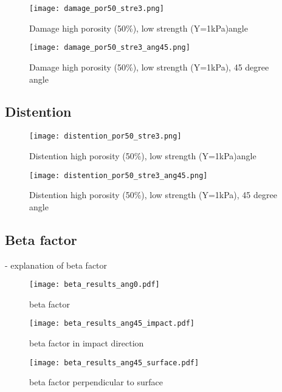 \begin{figure}[H]
   \centering
   \texttt{[image: damage\_por50\_stre3.png]}
   \caption{Damage high porosity (50\%), low strength (Y=1kPa)angle}
   \label{fig:crater6}
\end{figure}

\begin{figure}[H]
   \centering
   \texttt{[image: damage\_por50\_stre3\_ang45.png]}
   \caption{Damage high porosity (50\%), low strength (Y=1kPa), 45 degree angle}
   \label{fig:crater6}
\end{figure}

\subsection{Distention}

\begin{figure}[H]
   \centering
   \texttt{[image: distention\_por50\_stre3.png]}
   \caption{Distention high porosity (50\%), low strength (Y=1kPa)angle}
   \label{fig:crater6}
\end{figure}

\begin{figure}[H]
   \centering
   \texttt{[image: distention\_por50\_stre3\_ang45.png]}
   \caption{Distention high porosity (50\%), low strength (Y=1kPa), 45 degree angle}
   \label{fig:crater6}
\end{figure}

\subsection{Beta factor}
- explanation of beta factor

\begin{figure}[H]
   \centering
   \texttt{[image: beta\_results\_ang0.pdf]}
   \caption{beta factor}
   \label{fig:beta_factor_0}
\end{figure}

\begin{figure}[H]
   \centering
   \texttt{[image: beta\_results\_ang45\_impact.pdf]}
   \caption{beta factor in impact direction}
   \label{fig:beta_factor_45_impact}
\end{figure}

\begin{figure}[H]
   \centering
   \texttt{[image: beta\_results\_ang45\_surface.pdf]}
   \caption{beta factor perpendicular to surface}
   \label{fig:beta_factor_45_surface}
\end{figure}

